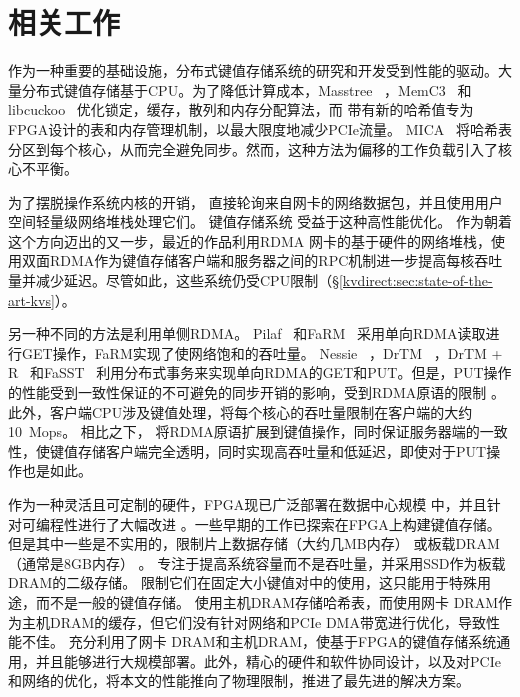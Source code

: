 \section{相关工作}
\label{kvdirect:sec:related}

作为一种重要的基础设施，分布式键值存储系统的研究和开发受到性能的驱动。大量分布式键值存储基于CPU。为了降低计算成本，Masstree~ \cite {mao2012cache}，MemC3~ \cite {fan2013memc3}和libcuckoo~ \cite {li2014algorithmic}优化锁定，缓存，散列和内存分配算法，而 \oursys{} 带有新的哈希值专为FPGA设计的表和内存管理机制，以最大限度地减少PCIe流量。 MICA~ \cite {lim2014mica}将哈希表分区到每个核心，从而完全避免同步。然而，这种方法为偏移的工作负载引入了核心不平衡。

为了摆脱操作系统内核的开销， \cite {rizzo2012netmap,intel2014data}直接轮询来自网卡的网络数据包，并且\cite {jeong2014mtcp,marinos2014network}使用用户空间轻量级网络堆栈处理它们。
键值存储系统 \cite {kapoor2012chronos,ousterhout2010case,ousterhout2015ramcloud,lim2014mica,li2016full}受益于这种高性能优化。
作为朝着这个方向迈出的又一步，最近的作品\cite {infiniband2000infiniband,kalia2014using,kalia2016design,kalia2014using,kalia2016design}利用RDMA 网卡的基于硬件的网络堆栈，使用双面RDMA作为键值存储客户端和服务器之间的RPC机制进一步提高每核吞吐量并减少延迟。尽管如此，这些系统仍受CPU限制（\S \ref {kvdirect:sec:state-of-the-art-kvs}）。

另一种不同的方法是利用单侧RDMA。 Pilaf~ \cite {mitchell2013using}和FaRM~ \cite {dragojevic2014farm}采用单向RDMA读取进行GET操作，FaRM实现了使网络饱和的吞吐量。 Nessie~ \cite {szepesi2014designing}，DrTM~ \cite {wei2015fast}，DrTM + R~ \cite {chen2016fast}和FaSST~ \cite {kalia2016fasst}利用分布式事务来实现单向RDMA的GET和PUT。但是，PUT操作的性能受到一致性保证的不可避免的同步开销的影响，受到RDMA原语的限制 \cite {kalia2016design}。此外，客户端CPU涉及键值处理，将每个核心的吞吐量限制在客户端的大约10~Mops。
相比之下，\oursys{} 将RDMA原语扩展到键值操作，同时保证服务器端的一致性，使键值存储客户端完全透明，同时实现高吞吐量和低延迟，即使对于PUT操作也是如此。

作为一种灵活且可定制的硬件，FPGA现已广泛部署在数据中心规模 \cite {putnam2014reconfigurable,caulfield2016cloud}中，并且针对可编程性进行了大幅改进 \cite {bacon2013fpga,li2016clicknp}。一些早期的工作已探索在FPGA上构建键值存储。但是其中一些是不实用的，限制片上数据存储（大约几MB内存） \cite {liang16fpl}或板载DRAM（通常是8GB内存） \cite {istvan2013flexible,chalamalasetti2013fpga,istvan2015hash}。
 \cite {blott2015scaling}专注于提高系统容量而不是吞吐量，并采用SSD作为板载DRAM的二级存储。
 \cite {liang16fpl,chalamalasetti2013fpga}限制它们在固定大小键值对中的使用，这只能用于特殊用途，而不是一般的键值存储。
\cite {blott13hotcloud,lavasani2014fpga}使用主机DRAM存储哈希表，而\cite {tokusashi2016multilevel}使用网卡 DRAM作为主机DRAM的缓存，但它们没有针对网络和PCIe DMA带宽进行优化，导致性能不佳。
\oursys{} 充分利用了网卡 DRAM和主机DRAM，使基于FPGA的键值存储系统通用，并且能够进行大规模部署。此外，精心的硬件和软件协同设计，以及对PCIe和网络的优化，将本文的性能推向了物理限制，推进了最先进的解决方案。

